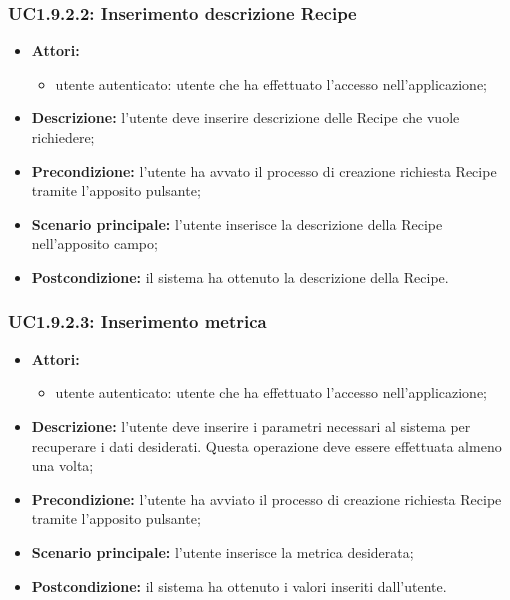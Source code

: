 \subsubsection{UC1.9.2.2: Inserimento descrizione Recipe}
\begin{itemize}
	\item \textbf{Attori:}
	\begin{itemize}
		\item utente autenticato: utente che ha effettuato l'accesso nell'applicazione;
	\end{itemize}
	\item \textbf{Descrizione:} l'utente deve inserire descrizione delle Recipe che vuole richiedere;
	\item \textbf{Precondizione:} l'utente ha avvato il processo di creazione richiesta Recipe tramite l'apposito pulsante;
	\item \textbf{Scenario principale:} l'utente inserisce la descrizione della Recipe nell'apposito campo;
	\item \textbf{Postcondizione:} il sistema ha ottenuto la descrizione della Recipe.
\end{itemize}

\subsubsection{UC1.9.2.3: Inserimento metrica}
\begin{itemize}
	\item \textbf{Attori:}
	\begin{itemize}
		\item utente autenticato: utente che ha effettuato l'accesso nell'applicazione;
	\end{itemize}
	\item \textbf{Descrizione:} l'utente deve inserire i parametri necessari al sistema per recuperare i dati desiderati. Questa operazione deve essere effettuata almeno una volta;
	\item \textbf{Precondizione:} l'utente ha avviato il processo di creazione richiesta Recipe tramite l'apposito pulsante;
	\item \textbf{Scenario principale:} l'utente inserisce la metrica desiderata;
	\item \textbf{Postcondizione:} il sistema ha ottenuto i valori inseriti dall'utente.
\end{itemize}

